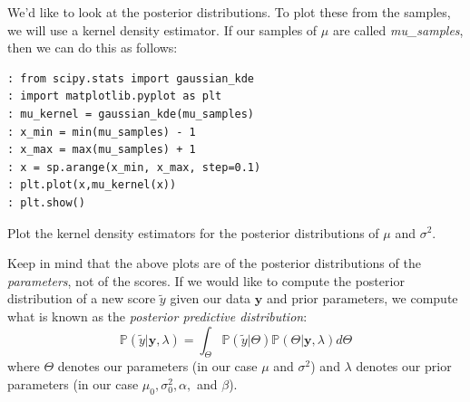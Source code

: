 We'd like to look at the posterior distributions. To plot these from the samples, we will use a kernel density estimator. If our samples of $\mu$ are called \emph{mu\_samples}, then we can do this as follows:

\begin{lstlisting}[style=python]
: from scipy.stats import gaussian_kde
: import matplotlib.pyplot as plt
: mu_kernel = gaussian_kde(mu_samples)
: x_min = min(mu_samples) - 1
: x_max = max(mu_samples) + 1
: x = sp.arange(x_min, x_max, step=0.1)
: plt.plot(x,mu_kernel(x))
: plt.show()
\end{lstlisting}

\begin{figure}
\begin{center}
\end{center}
\end{figure}

\begin{problem}
Plot the kernel density estimators for the posterior distributions of $\mu$ and $\sigma^{2}$.
\end{problem}

Keep in mind that the above plots are of the posterior distributions of the \emph{parameters}, not of the scores. If we would like to compute the posterior distribution of a new score $\tilde{y}$ given our data $\mathbf{y}$ and prior parameters, we compute what is known as the \emph{posterior predictive distribution}: $$\mathbb{P}(\tilde{y} | \mathbf{y}, \lambda) = \int_{\Theta} \mathbb{P}(\tilde{y} | \Theta)\mathbb{P}(\Theta | \mathbf{y}, \lambda) d\Theta$$ where $\Theta$ denotes our parameters (in our case $\mu$ and $\sigma^{2}$) and $\lambda$ denotes our prior parameters (in our case $\mu_{0}, \sigma_{0}^{2}, \alpha,$ and $\beta$).

